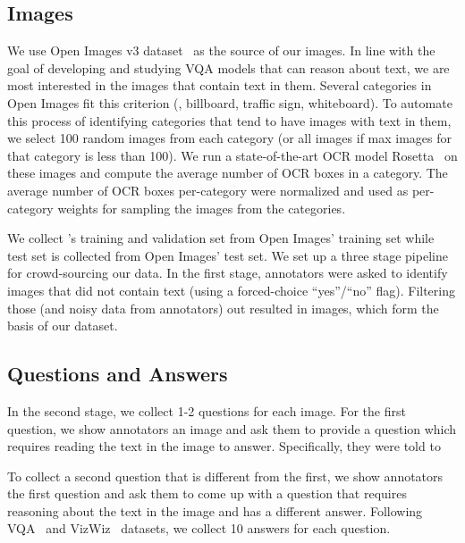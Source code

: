 \documentclass[10pt,twocolumn,letterpaper]{article}
\begin{document}
\subsection{Images}
We use Open Images v3 dataset~\cite{krasin2016openimages} as the source of our images. In line with the goal of developing and studying VQA models that can reason about text, we are most interested in the images that contain text in them. Several categories in Open Images fit this criterion (\eg, billboard, traffic  sign, whiteboard). To automate this process of identifying categories that tend to have images with text in them, we select 100 random images from each category (or all images if max images for that category is less than 100). We run a state-of-the-art OCR model Rosetta~\cite{borisyuk2018rosetta} on these images and compute the average number of OCR boxes in a category. The average number of OCR boxes per-category were normalized and used as per-category weights for sampling the images from the categories.

We collect \datasetName's training and validation set from Open Images' training set while test set is collected from Open Images' test set. We set up a three stage pipeline for crowd-sourcing our data. In the first stage, annotators were asked to identify images that did not contain text (using a forced-choice ``yes''/``no'' flag). Filtering those (and noisy data from annotators) out resulted in \datasetNImages images, which form the basis of our \datasetName{} dataset. 

\subsection{Questions and Answers}
In the second stage, we 
collect 1-2
questions for each image. For the first question, we show annotators an image and ask them to provide a question which requires reading the text in the image to answer. Specifically, they were told to  

To collect a second question that is different from the first, we show annotators the first question and ask them to come up with a question 
that requires reasoning about the text in the image and has a different answer.
Following VQA~\cite{antol2015vqa,balanced_vqa_v2} and VizWiz~\cite{gurari2018vizwiz} datasets, we collect 10 answers for each question.
\end{document}
